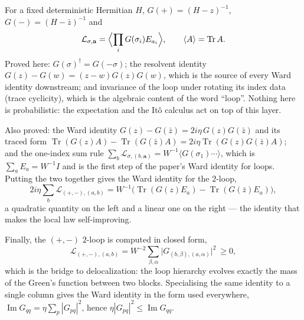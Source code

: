 \begin{definition}\label{def:gloop}
  \leanok{}
  For a fixed deterministic Hermitian $H$, $G(+) = (H-z)^{-1}$, $G(-) = (H-\bar z)^{-1}$ and
  \[ \mathcal L_{\sigma,\mathbf a} = \Bigl\langle \prod_i G(\sigma_i) E_{a_i} \Bigr\rangle ,
     \qquad \langle A\rangle = \operatorname{Tr} A . \]
  Proved here: $G(\sigma)^\dagger = G(-\sigma)$; the resolvent identity
  $G(z)-G(w) = (z-w)G(z)G(w)$, which is the source of every Ward identity downstream;
  and invariance of the loop under rotating its index data (trace cyclicity), which is
  the algebraic content of the word ``loop''.  Nothing here is probabilistic: the
  expectation and the It\^o calculus act on top of this layer.

  Also proved: the Ward identity $G(z)-G(\bar z) = 2i\eta\,G(z)G(\bar z)$ and its traced
  form $\operatorname{Tr}(G(z)A)-\operatorname{Tr}(G(\bar z)A) = 2i\eta\operatorname{Tr}(G(z)G(\bar z)A)$;
  and the one-index sum rule $\sum_b \mathcal L_{\sigma,(b,\mathbf a)} = W^{-1}\langle G(\sigma_1)\cdots\rangle$,
  which is $\sum_a E_a = W^{-1}I$ and is the first step of the paper's Ward identity for loops.
  Putting the two together gives the Ward identity for the $2$-loop,
  \[ 2i\eta\sum_b \mathcal L_{(+,-),(a,b)}
     = W^{-1}\bigl(\operatorname{Tr}(G(z)E_a)-\operatorname{Tr}(G(\bar z)E_a)\bigr) , \]
  a quadratic quantity on the left and a linear one on the right --- the identity that
  makes the local law self-improving.

  Finally, the $(+,-)$ $2$-loop is computed in closed form,
  \[ \mathcal L_{(+,-),(a,b)} = W^{-2}\sum_{\beta,\alpha}
     \bigl|G_{(b,\beta),(a,\alpha)}\bigr|^2 \ \ge 0 , \]
  which is the bridge to delocalization: the loop hierarchy evolves exactly the mass of
  the Green's function between two blocks.  Specialising the same identity to a single
  column gives the Ward identity in the form used everywhere,
  $\operatorname{Im}G_{qq} = \eta\sum_p |G_{pq}|^2$, hence
  $\eta|G_{pq}|^2 \le \operatorname{Im}G_{qq}$.
\end{definition}

